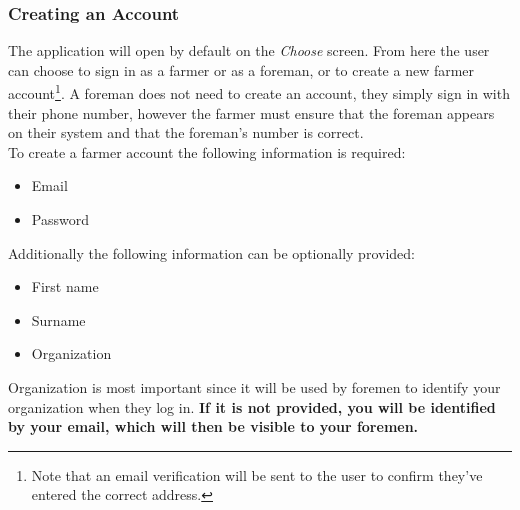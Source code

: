 \documentclass[11pt]{article}
\begin{document}
\subsubsection{Creating an Account}
The application will open by default on the \textit{Choose} screen. From here the user can choose to sign in as a farmer or as a foreman, or to create a new farmer account\footnote{Note that an email verification will be sent to the user to confirm they've entered the correct address.}. A foreman does not need to create an account, they simply sign in with their phone number, however the farmer must ensure that the foreman appears on their system and that the foreman's number is correct.\\
To create a farmer account the following information is required:
\begin{itemize}
 \item Email
 \item Password
\end{itemize}
Additionally the following information can be optionally provided:
\begin{itemize}
 \item First name
 \item Surname
 \item Organization
\end{itemize}
Organization is most important since it will be used by foremen to identify your organization when they log in. \textbf{If it is not provided, you will be identified by your email, which will then be visible to your foremen.}
\end{document}
